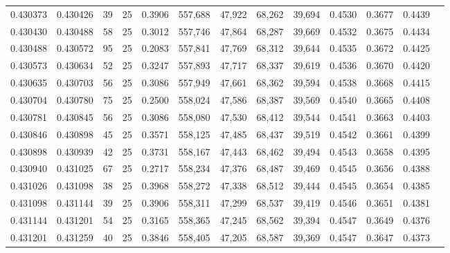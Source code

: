\begin{tabular}{rrrrrrrrrrrrr}
0.430373 & 0.430426 &    39 &  25 &                                     0.3906 & 557,688 &  47,922 &  68,262 &  39,694 & 0.4530 & 0.3677 & 0.4439 \\
0.430430 & 0.430488 &    58 &  25 &                                     0.3012 & 557,746 &  47,864 &  68,287 &  39,669 & 0.4532 & 0.3675 & 0.4434 \\
0.430488 & 0.430572 &    95 &  25 &                                     0.2083 & 557,841 &  47,769 &  68,312 &  39,644 & 0.4535 & 0.3672 & 0.4425 \\
0.430573 & 0.430634 &    52 &  25 &                                     0.3247 & 557,893 &  47,717 &  68,337 &  39,619 & 0.4536 & 0.3670 & 0.4420 \\
0.430635 & 0.430703 &    56 &  25 &                                     0.3086 & 557,949 &  47,661 &  68,362 &  39,594 & 0.4538 & 0.3668 & 0.4415 \\
0.430704 & 0.430780 &    75 &  25 &                                     0.2500 & 558,024 &  47,586 &  68,387 &  39,569 & 0.4540 & 0.3665 & 0.4408 \\
0.430781 & 0.430845 &    56 &  25 &                                     0.3086 & 558,080 &  47,530 &  68,412 &  39,544 & 0.4541 & 0.3663 & 0.4403 \\
0.430846 & 0.430898 &    45 &  25 &                                     0.3571 & 558,125 &  47,485 &  68,437 &  39,519 & 0.4542 & 0.3661 & 0.4399 \\
0.430898 & 0.430939 &    42 &  25 &                                     0.3731 & 558,167 &  47,443 &  68,462 &  39,494 & 0.4543 & 0.3658 & 0.4395 \\
0.430940 & 0.431025 &    67 &  25 &                                     0.2717 & 558,234 &  47,376 &  68,487 &  39,469 & 0.4545 & 0.3656 & 0.4388 \\
0.431026 & 0.431098 &    38 &  25 &                                     0.3968 & 558,272 &  47,338 &  68,512 &  39,444 & 0.4545 & 0.3654 & 0.4385 \\
0.431098 & 0.431144 &    39 &  25 &                                     0.3906 & 558,311 &  47,299 &  68,537 &  39,419 & 0.4546 & 0.3651 & 0.4381 \\
0.431144 & 0.431201 &    54 &  25 &                                     0.3165 & 558,365 &  47,245 &  68,562 &  39,394 & 0.4547 & 0.3649 & 0.4376 \\
0.431201 & 0.431259 &    40 &  25 &                                     0.3846 & 558,405 &  47,205 &  68,587 &  39,369 & 0.4547 & 0.3647 & 0.4373 \\

\end{tabular}
